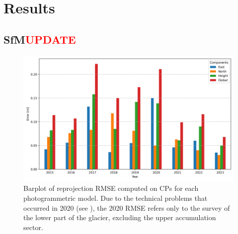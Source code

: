 \section{Results}\label{sec:3:res}

\subsection{SfM\textcolor{red}{UPDATE}}\label{sec:3:res:sfm}

\begin{figure}
    \centering
    \includegraphics[width=0.9\columnwidth]{uav_cp_error.png}
    \caption{Barplot of reprojection RMSE computed on CPs for each photogrammetric
        model. Due to the technical problems that occurred in 2020 
        (see ), the 2020 RMSE refers only to the survey of
        the lower part of the glacier, excluding the upper accumulation sector.
    }
    \label{fig:3:CP_errors}
\end{figure}

